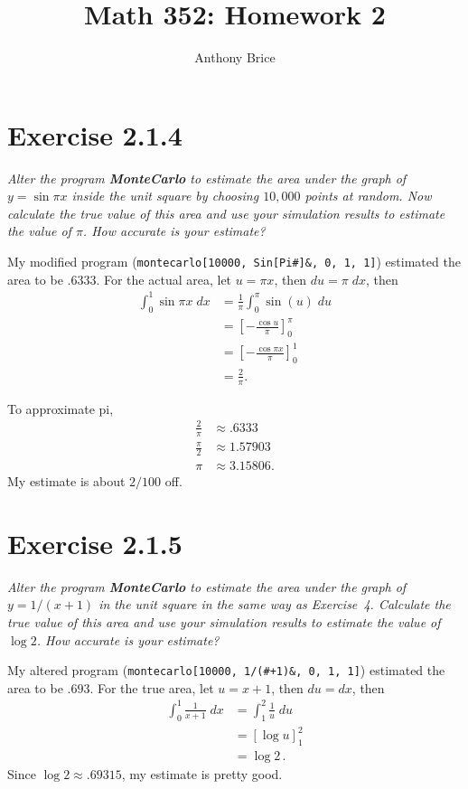 \documentclass{tufte-handout}
\title{Math 352: Homework 2}
\author{Anthony Brice}
\begin{document}
\maketitle

\section{Exercise 2.1.4}

\textit{Alter the program \textbf{MonteCarlo} to estimate the area
  under the graph of $y = \sin{\pi x}$ inside the unit square by
  choosing $10,000$ points at random. Now calculate the true value of
  this area and use your simulation results to estimate the value of
  $\pi$. How accurate is your estimate?}

\bigskip

My modified program (\lstinline$montecarlo[10000, Sin[Pi#]&, 0, 1, 1]$)
estimated the area to be $.6333$. For the actual area, let $u = \pi
x$, then $du = \pi \; dx$, then
\begin{align*}
  \int_0^1 \sin \pi x \; dx & = \frac{1}{\pi} \int_0^\pi
                              \sin(u) \; du \\
                            &= \left[ - \frac{\cos u}{\pi} \right]_0^\pi \\
                            &= \left[ - \frac{\cos \pi x}{\pi} \right]_0^1 \\
                            &= \frac{2}{\pi}.
\end{align*}

To approximate pi,
\begin{align*}
  \frac{2}{\pi} & \approx .6333 \\
  \frac{\pi}{2} & \approx 1.57903 \\
  \pi & \approx 3.15806.
\end{align*}
My estimate is about $2/100$ off.

\section{Exercise 2.1.5}

\textit{Alter the program \textbf{MonteCarlo} to estimate the area
  under the graph of $y = 1/(x+1)$ in the unit square in the same way
  as Exercise~4. Calculate the true value of this area and use your
  simulation results to estimate the value of $\log{2}$. How accurate
  is your estimate?}

\bigskip

My altered program (\lstinline$montecarlo[10000, 1/(#+1)&, 0, 1, 1]$)
estimated the area to be $.693$. For the true area, let $u = x +
1$, then $du = dx$, then
\begin{align*}
  \int_0^1 \frac{1}{x+1} \; dx &= \int_1^2 \frac{1}{u} \;
                                 du \\
                               &= \left[ \log{u} \right]_1^2 \\
                               &= \log{2} \, .
\end{align*}
Since $\log{2} \approx .69315$, my estimate is pretty good.
\end{document}
